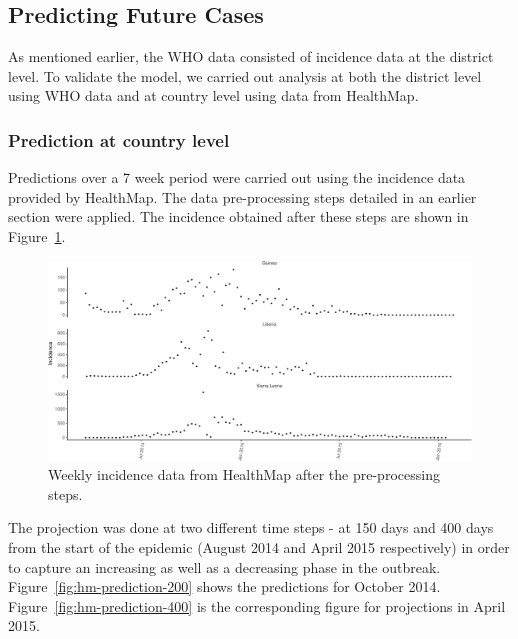 \documentclass[11pt,]{article}
\begin{document}
\subsection{Predicting Future Cases}\label{predicting-future-cases}

As mentioned earlier, the WHO data consisted of incidence data at the district level. To
validate the model, we carried out analysis at both the district level
using WHO data and at country level using data from HealthMap.

\subsubsection{Prediction at country level}

Predictions over a 7 week period were carried out using the incidence
data provided by HealthMap. The data pre-processing steps detailed in
an earlier section were applied. The incidence obtained after these
steps are shown in Figure~\ref{fig:hm-incid}.

\begin{figure}
  \centering
  \includegraphics[]{ms6-figures/hm_weekly_incid-1}
  \caption{Weekly incidence data from HealthMap after the pre-processing
    steps.}
  \label{fig:hm-incid}
\end{figure}

The projection was done at two
different time steps - at 150 days and 400 days from the start of the
epidemic (August 2014 and April 2015
respectively) in order to capture an increasing as well as a
decreasing phase in the outbreak. Figure~\ref{fig:hm-prediction-200} shows the
predictions for October 2014. Figure~\ref{fig:hm-prediction-400} is
the corresponding figure for projections in April 2015.
\end{document}
